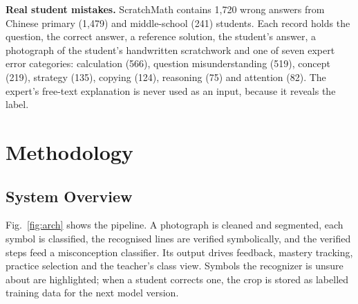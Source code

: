 \documentclass[runningheads]{llncs}
\begin{document}
\textbf{Real student mistakes.} ScratchMath contains 1,720 wrong answers from Chinese primary (1,479) and middle-school (241) students. Each record holds the question, the correct answer, a reference solution, the student's answer, a photograph of the student's handwritten scratchwork and one of seven expert error categories: calculation (566), question misunderstanding (519), concept (219), strategy (135), copying (124), reasoning (75) and attention (82). The expert's free-text explanation is never used as an input, because it reveals the label.

\section{Methodology}

\subsection{System Overview}

Fig.~\ref{fig:arch} shows the pipeline. A photograph is cleaned and segmented, each symbol is classified, the recognised lines are verified symbolically, and the verified steps feed a misconception classifier. Its output drives feedback, mastery tracking, practice selection and the teacher's class view. Symbols the recognizer is unsure about are highlighted; when a student corrects one, the crop is stored as labelled training data for the next model version.
\end{document}
